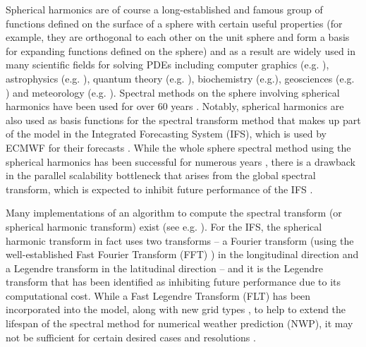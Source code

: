 Spherical harmonics are of course a long-established and famous group of functions defined on the surface of a sphere with certain useful properties (for example, they are orthogonal to each other on the unit sphere and form a basis for expanding functions defined on the sphere) and as a result are widely used in many scientific fields for solving PDEs including computer graphics (e.g. \cite{moon2008efficient, sloan2013efficient}), astrophysics (e.g. \cite{vasil2019tensor}), quantum theory (e.g. \cite{varshalovich1988quantum}), biochemistry (e.g.\cite{parimal2014application, basko1998application}), geosciences (e.g. \cite{fletcher2017data, hollerbach2013parity}) and meteorology (e.g. \cite{evans1998spherical, rubinstein2015scalar, wedi2013fast, ecmwf2020scalability, courtier1998ecmwf, silberman1954planetary, gottlieb1977numerical}). Spectral methods on the sphere involving spherical harmonics have been used for over 60 years \cite{silberman1954planetary}. Notably, spherical harmonics are also used as basis functions for the spectral transform method that makes up part of the model in the Integrated Forecasting System (IFS), which is used by ECMWF for their forecasts \cite{wedi2013fast}. While the whole sphere spectral method using the spherical harmonics has been successful for numerous years \cite{williamson2007evolution}, there is a drawback in the parallel scalability bottleneck that arises from the global spectral transform, which is expected to inhibit future performance of the IFS \cite{ecmwf2020scalability, wedi2013fast}. 

Many implementations of an algorithm to compute the spectral transform (or spherical harmonic transform) exist (see e.g. \cite{slevinsky2019fast, suda2002fast}). For the IFS, the spherical harmonic transform in fact uses two transforms -- a Fourier transform (using the well-established Fast Fourier Transform (FFT) \cite{cooley1965algorithm}) in the longitudinal direction and a Legendre transform in the latitudinal direction -- and it is the Legendre transform that has been identified as inhibiting future performance due to its computational cost. While a Fast Legendre Transform (FLT) \cite{wedi2013fast} has been incorporated into the model, along with new grid types \cite{malardel2016new}, to help to extend the lifespan of the spectral method for numerical weather prediction (NWP), it may not be sufficient for certain desired cases and resolutions \cite{wedi2014increasing}. 

